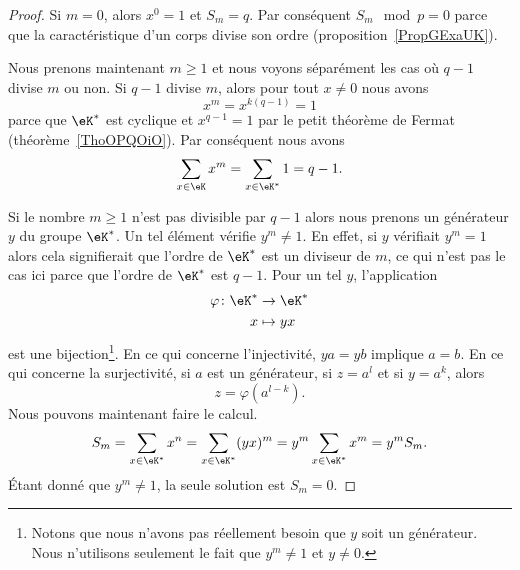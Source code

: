 \begin{proof}
    Si \( m=0\), alors \( x^0=1\) et \( S_m=q\). Par conséquent \( S_m\mod p=0\) parce que la caractéristique d'un corps divise son ordre (proposition~\ref{PropGExaUK}).

    Nous prenons maintenant \( m\geq 1\) et nous voyons séparément les cas où \( q-1\) divise \( m\) ou non. Si \( q-1\) divise \( m\), alors pour tout \( x\neq 0\) nous avons
    \begin{equation}
        x^m=x^{k(q-1)}=1
    \end{equation}
    parce que \( \eK^*\) est cyclique et \( x^{q-1}=1\) par le petit théorème de Fermat (théorème~\ref{ThoOPQOiO}). Par conséquent nous avons
    \begin{equation}
        \sum_{x\in \eK}x^m=\sum_{x\in \eK^*}1=q-1.
    \end{equation}

    Si le nombre \( m\geq 1\) n'est pas divisible par \( q-1\) alors nous prenons un générateur \( y\) du groupe \( \eK^*\). Un tel élément vérifie \( y^m\neq 1\). En effet, si \( y\) vérifiait \( y^m=1\) alors cela signifierait que l'ordre de \( \eK^*\) est un diviseur de \( m\), ce qui n'est pas le cas ici parce que l'ordre de \( \eK^*\) est \( q-1\). Pour un tel \( y\), l'application
    \begin{equation}
        \begin{aligned}
            \varphi\colon \eK^*&\to \eK^* \\
            x&\mapsto yx
        \end{aligned}
    \end{equation}
    est une bijection\footnote{Notons que nous n'avons pas réellement besoin que \( y\) soit un générateur. Nous n'utilisons seulement le fait que \( y^m\neq 1\) et \( y\neq 0\).}. En ce qui concerne l'injectivité, \( ya=yb\) implique \( a=b\). En ce qui concerne la surjectivité, si \( a\) est un générateur, si \( z=a^l\) et si \( y=a^k\), alors
    \begin{equation}
        z=\varphi(a^{l-k}).
    \end{equation}
    Nous pouvons maintenant faire le calcul.
    \begin{equation}
        S_m=\sum_{x\in \eK^*}x^n=\sum_{x\in \eK^*}(yx)^m=y^m\sum_{x\in \eK^*}x^m=y^mS_m.
    \end{equation}
    Étant donné que \( y^m\neq 1\), la seule solution est \( S_m=0\).
\end{proof}

